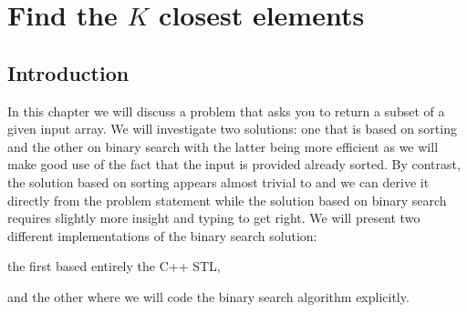 %

\chapter{Find the $K$ closest elements}
\label{ch:find_k_closest_in_array}
\section*{Introduction}
In this chapter we will discuss a problem that asks you to return a subset of a given input
array. We will investigate two solutions: one that is based on sorting and the other on binary
search with the latter being more efficient as we will make good use of the
fact that the input is provided already sorted. By contrast,  the solution based on
sorting appears almost trivial to and we can derive it directly from the problem
statement while the solution based on binary search requires slightly more insight and typing to
get right. We will present two different implementations of the binary search solution: 
\begin{enumerate*}
	\item the first based entirely the C++ STL,
	\item and the other where we will code the binary search algorithm explicitly. 
\end{enumerate*}

